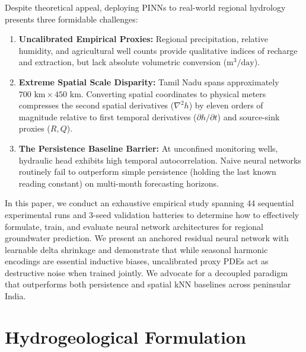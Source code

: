 \documentclass[10pt,conference,letterpaper]{IEEEtran}
\begin{document}
Despite theoretical appeal, deploying PINNs to real-world regional hydrology presents three formidable challenges:
\begin{enumerate}
    \item \textbf{Uncalibrated Empirical Proxies:} Regional precipitation, relative humidity, and agricultural well counts provide qualitative indices of recharge and extraction, but lack absolute volumetric conversion ($\text{m}^3/\text{day}$).
    \item \textbf{Extreme Spatial Scale Disparity:} Tamil Nadu spans approximately $700\text{ km} \times 450\text{ km}$. Converting spatial coordinates to physical meters compresses the second spatial derivatives ($\nabla^2 h$) by eleven orders of magnitude relative to first temporal derivatives ($\partial h / \partial t$) and source-sink proxies ($R, Q$).
    \item \textbf{The Persistence Baseline Barrier:} At unconfined monitoring wells, hydraulic head exhibits high temporal autocorrelation. Naive neural networks routinely fail to outperform simple persistence (holding the last known reading constant) on multi-month forecasting horizons.
\end{enumerate}

In this paper, we conduct an exhaustive empirical study spanning 44 sequential experimental runs and 3-seed validation batteries to determine how to effectively formulate, train, and evaluate neural network architectures for regional groundwater prediction. We present an anchored residual neural network with learnable delta shrinkage and demonstrate that while seasonal harmonic encodings are essential inductive biases, uncalibrated proxy PDEs act as destructive noise when trained jointly. We advocate for a decoupled paradigm that outperforms both persistence and spatial kNN baselines across peninsular India.

\section{Hydrogeological Formulation}
\end{document}
